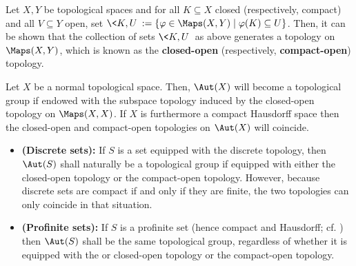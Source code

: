             \begin{definition} \label{def: the_compact_open_topology}
                Let $X, Y$ be topological spaces and for all $K \subseteq X$ closed (respectively, compact) and all $V \subseteq Y$ open, set $\<K, U\> := \{\varphi \in \Maps(X, Y) \mid \varphi(K) \subseteq U\}$. Then, it can be shown that the collection of sets $\<K, U\>$ as above generates a topology on $\Maps(X, Y)$, which is known as the \textbf{closed-open} (respectively, \textbf{compact-open}) topology.
            \end{definition}
            \begin{lemma} \label{lemma: the_compact_open_topology_on_automorphism_groups}
                \cite[Theorem 3.5.2 and Corollary 3.5.3]{topological_groups_and_related_structures} Let $X$ be a normal topological space. Then, $\Aut(X)$ will become a topological group if endowed with the subspace topology induced by the closed-open topology on $\Maps(X, X)$. If $X$ is furthermore a compact Hausdorff space then the closed-open and compact-open topologies on $\Aut(X)$ will coincide.
            \end{lemma}
            \begin{example} \label{example: the_compact_open_topology_on_automorphism_groups_of_sets}
                \noindent
                \begin{itemize}
                    \item \textbf{(Discrete sets):} \cite[\href{https://stacks.math.columbia.edu/tag/0BMC}{Tag 0BMC}]{stacks} If $S$ is a set equipped with the discrete topology, then $\Aut(S)$ shall naturally be a topological group if equipped with either the closed-open topology or the compact-open topology. However, because discrete sets are compact if and only if they are finite, the two topologies can only coincide in that situation.
                    \item \textbf{(Profinite sets):} If $S$ is a profinite set (hence compact and Hausdorff; cf. \cite[\href{https://stacks.math.columbia.edu/tag/08ZY}{Tag 08ZY}]{stacks}) then $\Aut(S)$ shall be the same topological group, regardless of whether it is equipped with the or closed-open topology or the compact-open topology. 
                \end{itemize}
            \end{example}

